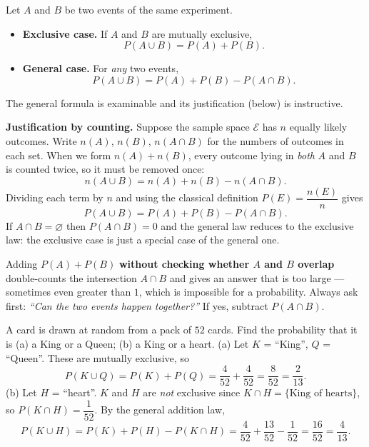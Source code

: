 \documentclass[11pt]{article}
\newcounter{popsec}
\newcounter{popsub}
\newcommand{\courssub}[1]{%
  \stepcounter{popsub}%
  \par\vspace{9pt}\noindent{\popxbold\fontsize{11.5}{13}\selectfont\color{popink}{\color{poporange}\thepopsec.\thepopsub}\hspace{6pt}#1}\par\nopagebreak\vspace{4pt}
}
\begin{document}
\courssub{The addition law}

\begin{propriete}
Let $A$ and $B$ be two events of the same experiment.
\begin{itemize}
\item \textbf{Exclusive case.} If $A$ and $B$ are mutually exclusive,
\[ P(A\cup B)=P(A)+P(B). \]
\item \textbf{General case.} For \emph{any} two events,
\[ P(A\cup B)=P(A)+P(B)-P(A\cap B). \]
\end{itemize}
The general formula is examinable and its justification (below) is instructive.
\end{propriete}

\textbf{Justification by counting.} Suppose the sample space $\mathcal{E}$ has $n$ equally likely outcomes. Write $n(A)$, $n(B)$, $n(A\cap B)$ for the numbers of outcomes in each set. When we form $n(A)+n(B)$, every outcome lying in \emph{both} $A$ and $B$ is counted twice, so it must be removed once:
\[ n(A\cup B)=n(A)+n(B)-n(A\cap B). \]
Dividing each term by $n$ and using the classical definition $P(E)=\dfrac{n(E)}{n}$ gives
\[ P(A\cup B)=P(A)+P(B)-P(A\cap B). \]
If $A\cap B=\varnothing$ then $P(A\cap B)=0$ and the general law reduces to the exclusive law: the exclusive case is just a special case of the general one.

\begin{attention}
Adding $P(A)+P(B)$ \textbf{without checking whether $A$ and $B$ overlap} double-counts the intersection $A\cap B$ and gives an answer that is too large — sometimes even greater than $1$, which is impossible for a probability. Always ask first: \emph{``Can the two events happen together?''} If yes, subtract $P(A\cap B)$.
\end{attention}

\begin{exoresolu}
A card is drawn at random from a pack of $52$ cards. Find the probability that it is (a) a King or a Queen; (b) a King or a heart.
\tcblower
(a) Let $K$ = ``King'', $Q$ = ``Queen''. These are mutually exclusive, so
\[ P(K\cup Q)=P(K)+P(Q)=\frac{4}{52}+\frac{4}{52}=\frac{8}{52}=\frac{2}{13}. \]
(b) Let $H$ = ``heart''. $K$ and $H$ are \emph{not} exclusive since $K\cap H=\{\text{King of hearts}\}$, so $P(K\cap H)=\dfrac{1}{52}$. By the general addition law,
\[ P(K\cup H)=P(K)+P(H)-P(K\cap H)=\frac{4}{52}+\frac{13}{52}-\frac{1}{52}=\frac{16}{52}=\frac{4}{13}. \]
\end{exoresolu}
\end{document}
